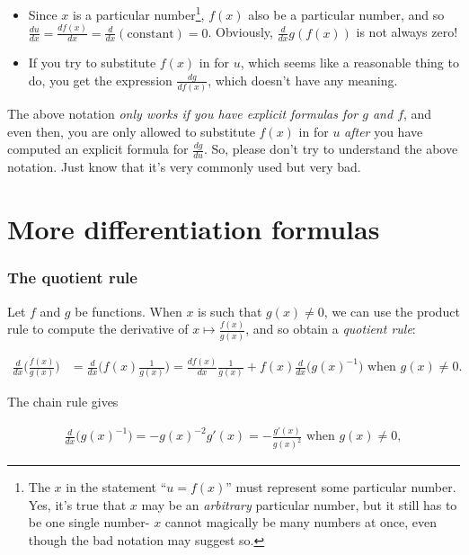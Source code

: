 \begin{itemize}
    \item Since $x$ is a particular number\footnote{The $x$ in the statement ``$u = f(x)$'' must represent some particular number. Yes, it's true that $x$ may be an \textit{arbitrary} particular number, but it still has to be one single number- $x$ cannot magically be many numbers at once, even though the bad notation may suggest so.}, $f(x)$ also be a particular number, and so $\frac{du}{dx} = \frac{df(x)}{dx} = \frac{d}{dx}(\text{constant}) = 0$. Obviously, $\frac{d}{dx}g(f(x))$ is not always zero! 
    \item If you try to substitute $f(x)$ in for $u$, which seems like a reasonable thing to do, you get the expression $\frac{dg}{df(x)}$, which doesn't have any meaning.
\end{itemize}

The above notation \textit{only works if you have explicit formulas for $g$ and $f$}, and even then, you are only allowed to substitute $f(x)$ in for $u$ \textit{after} you have computed an explicit formula for $\frac{dg}{du}$. So, please don't try to understand the above notation. Just know that it's very commonly used but very bad.

\section*{More differentiation formulas}

\subsubsection*{The quotient rule}

Let $f$ and $g$ be functions. When $x$ is such that $g(x) \neq 0$, we can use the product rule to compute the derivative of $x \mapsto \frac{f(x)}{g(x)}$, and so obtain a \textit{quotient rule}:

\begin{align*}
    \frac{d}{dx}\Big(\frac{f(x)}{g(x)}\Big)
    &= \frac{d}{dx}\Big(f(x) \frac{1}{g(x)} \Big)  = \frac{df(x)}{dx} \frac{1}{g(x)} + f(x) \frac{d}{dx}\Big(g(x)^{-1} \Big) \text{ when $g(x) \neq 0$}.
\end{align*}

The chain rule gives

\begin{align*}
    \frac{d}{dx}\Big(g(x)^{-1} \Big) = -g(x)^{-2}g'(x) = -\frac{g'(x)}{g(x)^2} \text{ when $g(x) \neq 0$},
\end{align*}

